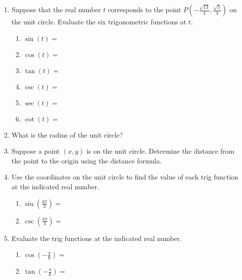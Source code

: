 


\begin{enumerate}
\item  Suppose that the real number $t$ corresponds to the point $\displaystyle P\left(-\frac{\sqrt{13}}{4},\frac{\sqrt{3}}{4}\right)$ on the unit circle.  Evaluate the six trigonometric functions at $t$.
\begin{enumerate}

\item $\sin(t)=$\vfill
\item $\cos(t)=$\vfill
\item $\tan(t)=$\vfill
\item $\csc(t)=$\vfill
\item $\sec(t)=$\vfill
\item $\cot(t)=$\vfill
\end{enumerate}

\item What is the radius of the unit circle?
  \vfill

\item Suppose a point $(x,y)$ is on the unit circle. Determine the
  distance from the point to the origin using the distance formula.
    \vfill


\clearpage


\item Use the coordinates on the unit circle to find the value of each trig function at the indicated real number.
\begin{enumerate}
\item $\displaystyle \sin\left(\frac{4\pi}{3}\right)=$\vfill
\item $\displaystyle \csc\left(\frac{4\pi}{3}\right)=$\vfill
\end{enumerate}

\item  Evaluate the trig functions at the indicated real number.
\begin{enumerate}
\item $\displaystyle \cos\left(-\frac{\pi}{6}\right)=$\vfill
\item $\displaystyle \tan\left(-\frac{\pi}{6}\right)=$\vfill
\end{enumerate}




\end{enumerate}




